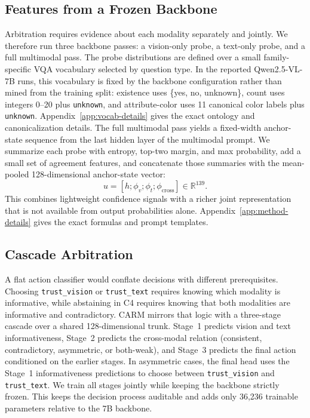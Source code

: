 \documentclass[11pt]{article}
\begin{document}


\subsection{Features from a Frozen Backbone}

Arbitration requires evidence about each modality separately and jointly. We therefore run
three backbone passes: a vision-only probe, a text-only probe, and a full multimodal pass.
The probe distributions are defined over a small family-specific VQA vocabulary selected by
question type. In the reported Qwen2.5-VL-7B runs, this vocabulary is fixed by the backbone
configuration rather than mined from the training split: existence uses \{yes, no,
unknown\}, count uses integers 0--20 plus \texttt{unknown}, and attribute-color uses 11
canonical color labels plus \texttt{unknown}. Appendix~\ref{app:vocab-details} gives the
exact ontology and canonicalization details. The full multimodal pass yields a fixed-width anchor-state
sequence from the last hidden layer of the multimodal prompt. We summarize each probe with
entropy, top-two margin, and max probability, add a small set of agreement features, and
concatenate those summaries with the mean-pooled 128-dimensional anchor-state vector:
\[
u = [h;\phi_v;\phi_t;\phi_{\text{cross}}] \in \mathbb{R}^{139}.
\]
This combines lightweight confidence signals with a richer joint representation that is not
available from output probabilities alone. Appendix~\ref{app:method-details} gives the
exact formulas and prompt templates.

\subsection{Cascade Arbitration}

A flat action classifier would conflate decisions with different prerequisites. Choosing
\texttt{trust\_vision} or \texttt{trust\_text} requires knowing which modality is
informative, while abstaining in C4 requires knowing that both modalities are informative
and contradictory. CARM mirrors that logic with a three-stage cascade over a shared
128-dimensional trunk. Stage~1 predicts vision and text informativeness, Stage~2 predicts
the cross-modal relation (consistent, contradictory, asymmetric, or both-weak), and
Stage~3 predicts the final action conditioned on the earlier stages. In asymmetric cases,
the final head uses the Stage~1 informativeness predictions to choose between
\texttt{trust\_vision} and \texttt{trust\_text}. We train all
stages jointly while keeping the backbone strictly frozen. This keeps the decision process
auditable and adds only 36,236 trainable parameters relative to the 7B backbone.
\end{document}
